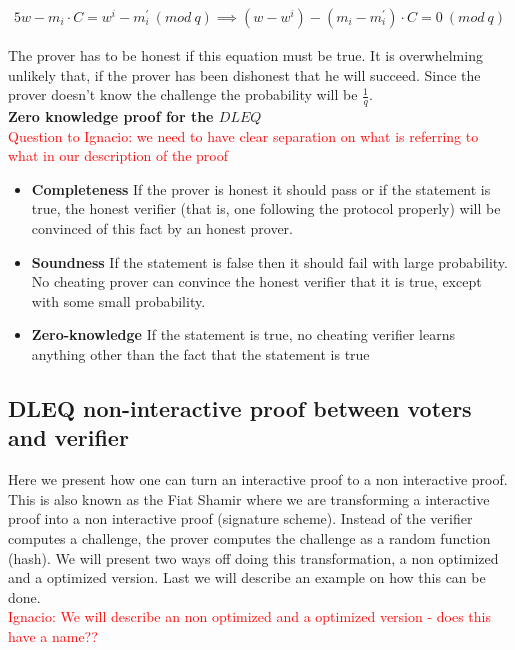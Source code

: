 \begin{alignat*}{5}
w-m_i \cdot C = w^i-m_i^{'}\ (mod\ q) \implies (w-w^i)-(m_i - m_i^{'})  \cdot  C = 0 \ (mod\ q) 
\end{alignat*}


\noindent
The prover has to be honest if this equation must be true. It is overwhelming unlikely that, if the prover has been dishonest that he will succeed. Since the prover doesn't know the challenge the probability will be \begin{math} \frac{1}{q}\end{math}.\\

\noindent
\textbf{Zero knowledge proof for the $DLEQ$}\\
\textcolor{red}{Question to Ignacio: we need to have clear separation on what is referring to what in our description of the proof}
\begin{itemize}
    
    \item \textbf{Completeness} If the prover is honest it should pass or if the statement is true, the honest verifier (that is, one following the protocol properly) will be convinced of this fact by an honest prover.
    
    \item \textbf{Soundness} If the statement is false then it should fail with large probability. No cheating prover can convince
the honest verifier that it is true, except with some small probability.
    
    
    \item \textbf{Zero-knowledge}  If the statement is true, no cheating verifier learns anything other than the fact that the statement is true
\end{itemize}


\subsection{DLEQ non-interactive proof between voters and verifier}
Here we present how one can turn an interactive proof to a non interactive proof. This is also known as the Fiat Shamir where we are transforming a interactive proof into a non interactive proof (signature scheme). Instead of the verifier computes a challenge, the prover computes the challenge as a random function (hash).  We will present two ways off doing this transformation, a non optimized and a optimized version. Last we will describe an example on how this can be done.\\
\textcolor{red}{Ignacio: We will describe an non optimized and a optimized version - does this have a name??}\\


